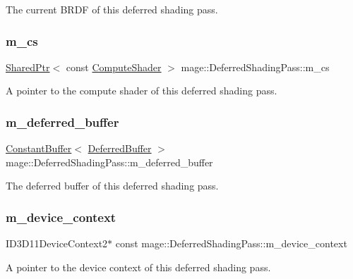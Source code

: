 The current B\+R\+DF of this deferred shading pass. \hypertarget{classmage_1_1_deferred_shading_pass_a8d3bebdc41d116eb05d9f5a3c923f349}{}\label{classmage_1_1_deferred_shading_pass_a8d3bebdc41d116eb05d9f5a3c923f349} 
\subsubsection{\texorpdfstring{m\+\_\+cs}{m\_cs}}
{\footnotesize\ttfamily \hyperlink{namespacemage_a1e01ae66713838a7a67d30e44c67703e}{Shared\+Ptr}$<$ const \hyperlink{namespacemage_ae040329401484b076f0cd1a7c43d19c9}{Compute\+Shader} $>$ mage\+::\+Deferred\+Shading\+Pass\+::m\+\_\+cs\hspace{0.3cm}{\ttfamily [private]}}

A pointer to the compute shader of this deferred shading pass. \hypertarget{classmage_1_1_deferred_shading_pass_ae8ab3aa2d2ff93368c7774d982cb8bb7}{}\label{classmage_1_1_deferred_shading_pass_ae8ab3aa2d2ff93368c7774d982cb8bb7} 
\subsubsection{\texorpdfstring{m\+\_\+deferred\+\_\+buffer}{m\_deferred\_buffer}}
{\footnotesize\ttfamily \hyperlink{structmage_1_1_constant_buffer}{Constant\+Buffer}$<$ \hyperlink{structmage_1_1_deferred_buffer}{Deferred\+Buffer} $>$ mage\+::\+Deferred\+Shading\+Pass\+::m\+\_\+deferred\+\_\+buffer\hspace{0.3cm}{\ttfamily [private]}}

The deferred buffer of this deferred shading pass. \hypertarget{classmage_1_1_deferred_shading_pass_aebba2ee59d127f2c186186c667c6016a}{}\label{classmage_1_1_deferred_shading_pass_aebba2ee59d127f2c186186c667c6016a} 
\subsubsection{\texorpdfstring{m\+\_\+device\+\_\+context}{m\_device\_context}}
{\footnotesize\ttfamily I\+D3\+D11\+Device\+Context2$\ast$ const mage\+::\+Deferred\+Shading\+Pass\+::m\+\_\+device\+\_\+context\hspace{0.3cm}{\ttfamily [private]}}

A pointer to the device context of this deferred shading pass. 